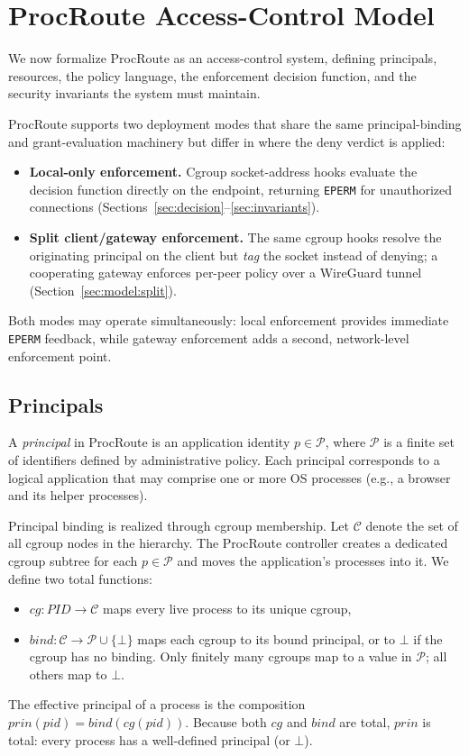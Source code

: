 \documentclass[sigconf]{acmart}
\begin{document}
\section{ProcRoute Access-Control Model}
\label{sec:model}

We now formalize ProcRoute as an access-control system, defining
principals, resources, the policy language, the enforcement decision
function, and the security invariants the system must maintain.

ProcRoute supports two deployment modes that share the same
principal-binding and grant-evaluation machinery but differ in
where the deny verdict is applied:
\begin{itemize}
  \item \textbf{Local-only enforcement.}
    Cgroup socket-address hooks evaluate the decision function
    directly on the endpoint, returning \texttt{EPERM} for
    unauthorized connections
    (Sections~\ref{sec:decision}--\ref{sec:invariants}).
  \item \textbf{Split client/gateway enforcement.}
    The same cgroup hooks resolve the originating principal on
    the client but \emph{tag} the socket instead of denying;
    a cooperating gateway enforces per-peer policy over a
    WireGuard tunnel
    (Section~\ref{sec:model:split}).
\end{itemize}
Both modes may operate simultaneously: local enforcement
provides immediate \texttt{EPERM} feedback, while gateway
enforcement adds a second, network-level enforcement point.

\subsection{Principals}

A \emph{principal} in ProcRoute is an application identity
$p \in \mathcal{P}$, where $\mathcal{P}$ is a finite set of
identifiers defined by administrative policy.
Each principal corresponds to a logical application that may
comprise one or more OS processes (e.g., a browser and its helper
processes).

Principal binding is realized through cgroup membership.
Let $\mathcal{C}$ denote the set of all cgroup nodes in the
hierarchy.  The ProcRoute controller creates a dedicated cgroup
subtree for each $p \in \mathcal{P}$ and moves the application's
processes into it.  We define two total functions:
\begin{itemize}
  \item $\mathit{cg}: \mathit{PID} \to \mathcal{C}$ maps every
    live process to its unique cgroup,
  \item $\mathit{bind}: \mathcal{C} \to \mathcal{P} \cup \{\bot\}$
    maps each cgroup to its bound principal, or to $\bot$ if the
    cgroup has no binding.  Only finitely many cgroups map to a
    value in $\mathcal{P}$; all others map to $\bot$.
\end{itemize}
The effective principal of a process is the composition
$\mathit{prin}(\mathit{pid}) = \mathit{bind}(\mathit{cg}(\mathit{pid}))$.
Because both $\mathit{cg}$ and $\mathit{bind}$ are total,
$\mathit{prin}$ is total: every process has a well-defined
principal (or $\bot$).
\end{document}
